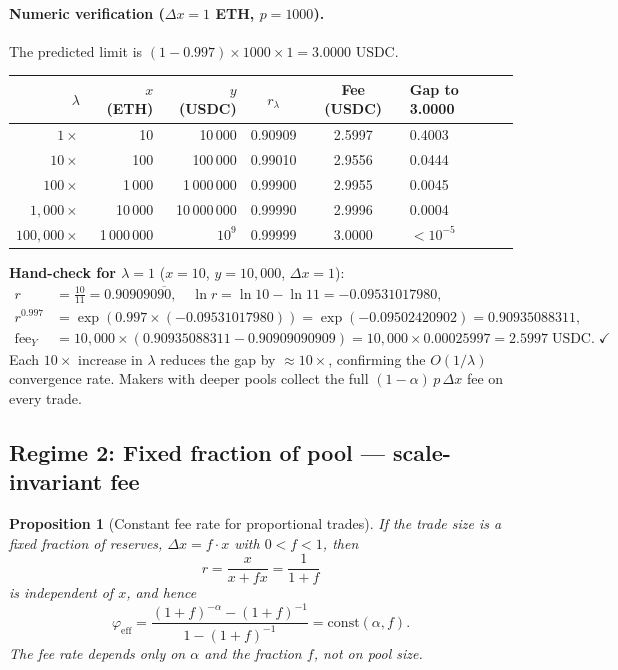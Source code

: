 \documentclass[11pt]{article}
\newtheorem{proposition}[theorem]{Proposition}
\theoremstyle{definition}
\theoremstyle{remark}
\newcommand{\dx}{\Delta x}
\begin{document}
\paragraph{Numeric verification ($\dx=1$ ETH, $p=1000$).}
The predicted limit is $(1{-}0.997)\times 1000\times 1=3.0000$ USDC.

\begin{center}
\begin{tabular}{@{}rrrccl@{}}
\toprule
$\lambda$ & $x$ (ETH) & $y$ (USDC) & $r_\lambda$ & Fee (USDC) & Gap to 3.0000 \\
\midrule
$1\times$ & 10 & 10\,000 & 0.90909 & 2.5997 & 0.4003 \\
$10\times$ & 100 & 100\,000 & 0.99010 & 2.9556 & 0.0444 \\
$100\times$ & 1\,000 & 1\,000\,000 & 0.99900 & 2.9955 & 0.0045 \\
$1{,}000\times$ & 10\,000 & 10\,000\,000 & 0.99990 & 2.9996 & 0.0004 \\
$100{,}000\times$ & 1\,000\,000 & $10^9$ & 0.99999 & 3.0000 & $<10^{-5}$ \\
\bottomrule
\end{tabular}
\end{center}

\noindent
\textbf{Hand-check for $\lambda=1$} ($x=10$, $y=10{,}000$, $\dx=1$):
\begin{align*}
r &= \tfrac{10}{11} = 0.909090\overline{90},\quad
\ln r = \ln 10-\ln 11 = -0.09531017980,\\
r^{0.997} &= \exp(0.997\times(-0.09531017980)) = \exp(-0.09502420902) = 0.90935088311,\\
\mathrm{fee}_Y &= 10{,}000\times(0.90935088311 - 0.90909090909) = 10{,}000\times 0.00025997 = 2.5997\;\text{USDC}.\;\checkmark
\end{align*}
Each $10\times$ increase in $\lambda$ reduces the gap by ${\approx}10\times$, confirming the $O(1/\lambda)$ convergence rate.
Makers with deeper pools collect the full $(1{-}\alpha)\,p\,\dx$ fee on every trade.

\subsection{Regime 2: Fixed fraction of pool --- scale-invariant fee}

\begin{proposition}[Constant fee rate for proportional trades]\label{prop:regime2}
If the trade size is a fixed fraction of reserves, $\dx=f\cdot x$ with $0<f<1$, then
\[
r=\frac{x}{x+fx}=\frac{1}{1+f}
\]
is independent of $x$, and hence
\[
\boxed{\varphi_{\mathrm{eff}}=\frac{(1+f)^{-\alpha}-(1+f)^{-1}}{1-(1+f)^{-1}}=\mathrm{const}(\alpha,f).}
\]
The fee rate depends only on $\alpha$ and the fraction $f$, not on pool size.
\end{proposition}
\end{document}
